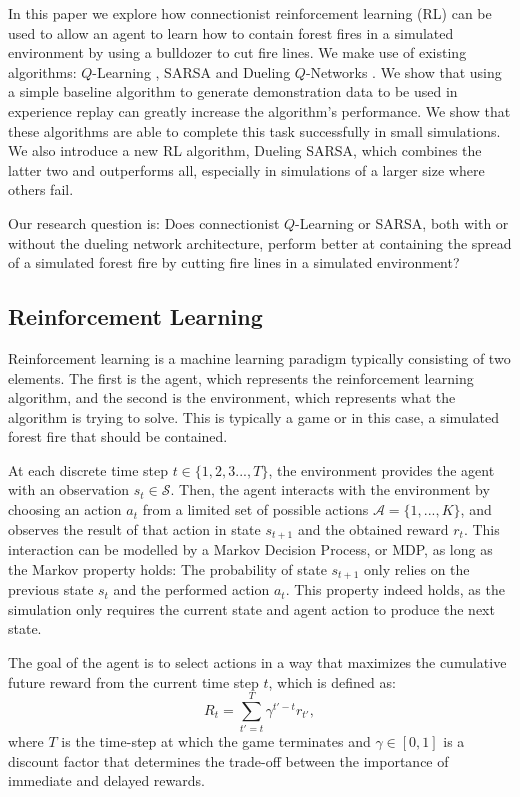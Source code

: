 In this paper we explore how connectionist reinforcement learning (RL) can be used to allow an agent to learn how to contain forest fires in a simulated environment by using a bulldozer to cut fire lines. We make use of existing algorithms: $Q$-Learning \citep{watkins1989learning}, SARSA \citep{rummery1994line} and Dueling $Q$-Networks \citep{wang2015dueling}. We show that using a simple baseline algorithm to generate demonstration data to be used in experience replay can greatly increase the algorithm's performance. We show that these algorithms are able to complete this task successfully in small simulations. We also introduce a new RL algorithm, Dueling SARSA, which combines the latter two and outperforms all, especially in simulations of a larger size where others fail.

Our research question is: Does connectionist $Q$-Learning or SARSA, both with or without the dueling network architecture, perform better at containing the spread of a simulated forest fire by cutting fire lines in a simulated environment?

\subsection{Reinforcement Learning}\label{sec:reinforcementlearning}
Reinforcement learning is a machine learning paradigm typically consisting of two elements. The first is the agent, which represents the reinforcement learning algorithm, and the second is the environment, which represents what the algorithm is trying to solve. This is typically a game or in this case, a simulated forest fire that should be contained.

At each discrete time step $t \in \{1,2,3...,T\}$, the environment provides the agent with an observation $s_t \in \mathcal{S}$. Then, the agent interacts with the environment by choosing an action $a_t$ from a limited set of possible actions $\mathcal{A}=\{1,...,K\}$, and observes the result of that action in state $s_{t+1}$ and the obtained reward $r_t$. This interaction can be modelled by a Markov Decision Process, or MDP, as long as the Markov property holds: The probability of state $s_{t+1}$ only relies on the previous state $s_t$ and the performed action $a_t$. This property indeed holds, as the simulation only requires the current state and agent action to produce the next state.

The goal of the agent is to select actions in a way that maximizes the cumulative future reward from the current time step $t$, which is defined as:
\begin{equation}\label{eq:cumulative_reward}
	R_t = \sum_{t'=t}^{T} \gamma^{t'-t} r_{t'},
\end{equation}
where $T$ is the time-step at which the game terminates and $\gamma \in [0,1]$ is a discount factor that determines the trade-off between the importance of immediate and delayed rewards. 

